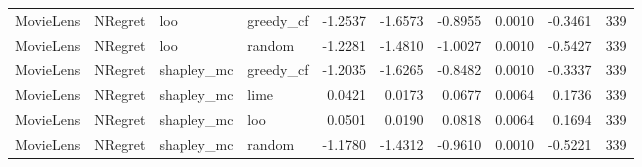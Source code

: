 \begin{longtable}{@{}p{.12\linewidth}p{.18\linewidth}p{.13\linewidth}p{.13\linewidth}rrrrrr@{}}
MovieLens & NRegret & loo & greedy\_cf & -1.2537 & -1.6573 & -0.8955 & 0.0010 & -0.3461 & 339 \\
MovieLens & NRegret & loo & random & -1.2281 & -1.4810 & -1.0027 & 0.0010 & -0.5427 & 339 \\
MovieLens & NRegret & shapley\_mc & greedy\_cf & -1.2035 & -1.6265 & -0.8482 & 0.0010 & -0.3337 & 339 \\
MovieLens & NRegret & shapley\_mc & lime & 0.0421 & 0.0173 & 0.0677 & 0.0064 & 0.1736 & 339 \\
MovieLens & NRegret & shapley\_mc & loo & 0.0501 & 0.0190 & 0.0818 & 0.0064 & 0.1694 & 339 \\
MovieLens & NRegret & shapley\_mc & random & -1.1780 & -1.4312 & -0.9610 & 0.0010 & -0.5221 & 339 \\
\end{longtable}
